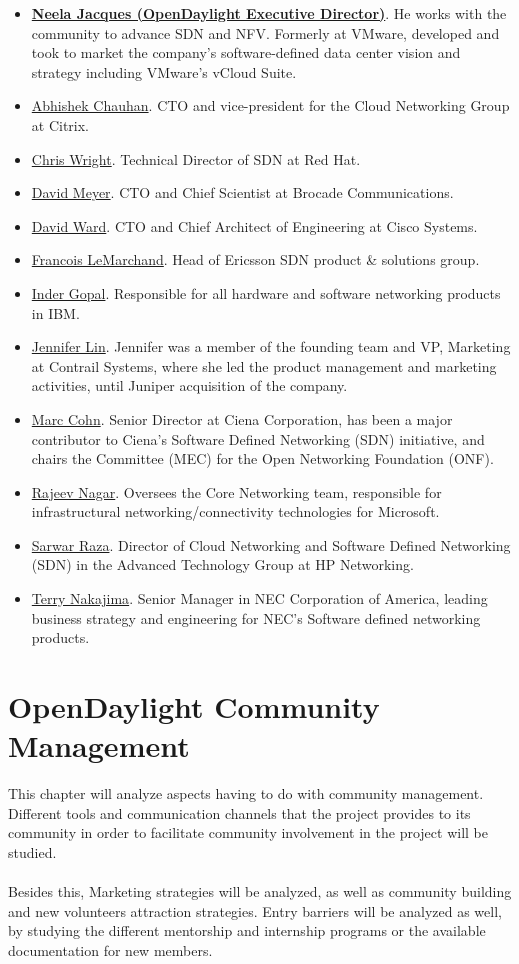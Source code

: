 \documentclass[a4paper, 12pt]{book}
\begin{document}
\begin{itemize}\itemsep0pt
\item{\underline{\textbf{Neela Jacques (OpenDaylight Executive Director)}}}. He works with the community to advance SDN and NFV. Formerly at VMware, developed and took to market the company’s software-defined data center vision and strategy including VMware’s vCloud Suite.
\item{\underline{Abhishek Chauhan}}. CTO and vice-president for the Cloud Networking Group at Citrix.
\item{\underline{Chris Wright}}. Technical Director of SDN at Red Hat.
\item{\underline{David Meyer}}. CTO and Chief Scientist at Brocade Communications.
\item{\underline{David Ward}}. CTO and Chief Architect of Engineering at Cisco Systems.
\item{\underline{Francois LeMarchand}}. Head of Ericsson SDN product \& solutions group.
\item{\underline{Inder Gopal}}. Responsible for all hardware and software networking products in IBM.
\item{\underline{Jennifer Lin}}. Jennifer was a member of the founding team and VP, Marketing at Contrail Systems, where she led the product management and marketing activities, until Juniper acquisition of the company.
\item{\underline{Marc Cohn}}. Senior Director at Ciena Corporation, has been a major contributor to Ciena’s Software Defined Networking (SDN) initiative, and chairs the Committee (MEC) for the Open Networking Foundation (ONF).
\item{\underline{Rajeev Nagar}}. Oversees the Core Networking team, responsible for infrastructural networking/connectivity technologies for Microsoft.
\item{\underline{Sarwar Raza}}. Director of Cloud Networking and Software Defined Networking (SDN) in the Advanced Technology Group at HP Networking.
\item{\underline{Terry Nakajima}}. Senior Manager in NEC Corporation of America, leading business strategy and engineering for NEC’s Software defined networking products.
\end{itemize}

\section{OpenDaylight Community Management}
\label{chap:odlcommunitymgmt}
This chapter will analyze aspects having to do with community management. Different tools and communication channels that the project provides to its community in order to facilitate community involvement in the project will be studied.\\
\\
Besides this, Marketing strategies will be analyzed, as well as community building and new volunteers attraction strategies. Entry barriers will be analyzed as well, by studying the different mentorship and internship programs or the available documentation for new members.
\end{document}
